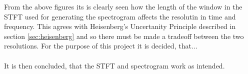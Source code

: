 From the above figures its is clearly seen how the length of the window in the STFT used for generating the spectrogram affects the resolutin in time and frequency. This agrees with Heisenberg's Uncertanity Principle described in section \ref{sec:heisenberg} and so there must be made a tradeoff between the two resolutions. For the purpose of this project it is decided, that...\\\\
It is then concluded, that the STFT and spectrogram work as intended.














